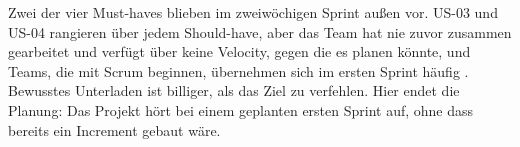 Zwei der vier Must-haves blieben im zweiwöchigen Sprint außen vor. US-03 und
US-04 rangieren über jedem Should-have, aber das Team hat nie zuvor zusammen
gearbeitet und verfügt über keine Velocity, gegen die es planen könnte, und
Teams, die mit Scrum beginnen, übernehmen sich im ersten Sprint häufig
\parencite[p.~107]{schwaber2004}. Bewusstes Unterladen ist billiger, als das
Ziel zu verfehlen. Hier endet die Planung: Das Projekt hört bei einem geplanten
ersten Sprint auf, ohne dass bereits ein Increment gebaut wäre.


%
%
%


%
%


